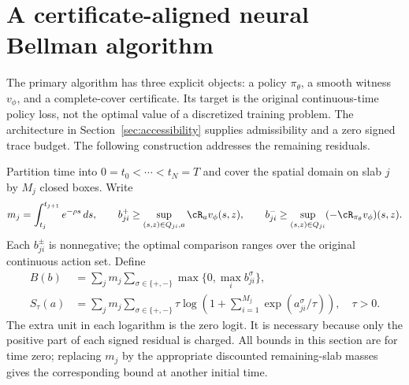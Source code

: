 \section{A certificate-aligned neural Bellman algorithm}\label{sec:aligned}
The primary algorithm has three explicit objects: a policy $\pi_\theta$, a smooth witness $v_\phi$, and a complete-cover certificate. Its target is the original continuous-time policy loss, not the optimal value of a discretized training problem. The architecture in Section~\ref{sec:accessibility} supplies admissibility and a zero signed trace budget. The following construction addresses the remaining residuals.

Partition time into $0=t_0<\cdots<t_N=T$ and cover the spatial domain on slab $j$ by $M_j$ closed boxes. Write
\[
 m_j=\int_{t_j}^{t_{j+1}}e^{-\rho s}\,ds,
 \qquad b^+_{ji}\geq\sup_{(s,z)\in Q_{ji},a}\cR_a v_\phi(s,z),\qquad
 b^-_{ji}\geq\sup_{(s,z)\in Q_{ji}}(-\cR_{\pi_\theta}v_\phi)(s,z).
\]
Each $b^\pm_{ji}$ is nonnegative; the optimal comparison ranges over the original continuous action set. Define
\begin{align}
 B(b)&=\sum_j m_j\sum_{\sigma\in\{+,-\}}\max\{0,\max_i b^\sigma_{ji}\},\label{eq:coverB}\\
 S_\tau(a)&=\sum_jm_j\sum_{\sigma\in\{+,-\}}
 \tau\log\left(1+\sum_{i=1}^{M_j}\exp(a^\sigma_{ji}/\tau)\right),\quad \tau>0.\label{eq:smoothS}
\end{align}
The extra unit in each logarithm is the zero logit. It is necessary because only the positive part of each signed residual is charged. All bounds in this section are for time zero; replacing $m_j$ by the appropriate discounted remaining-slab masses gives the corresponding bound at another initial time.

